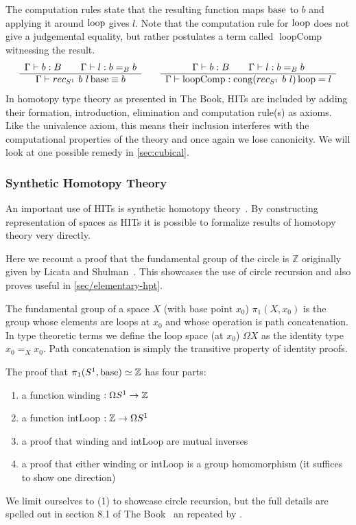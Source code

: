 The computation rules state that the resulting function maps $\operatorname{base}$ to $b$
and applying it around $\operatorname{loop}$ gives $l$.
Note that the computation rule for $\operatorname{loop}$ does not give a judgemental
equality, but rather postulates a term called $\operatorname{loopComp}$
witnessing the result.
\begin{equation*}
  \begin{array}[t]{c}
    \Gamma \vdash b : B \qquad \Gamma \vdash l : b =_B b\\
    \hline
    \Gamma \vdash rec_{S^1}~b~l \operatorname{base} \equiv b
  \end{array}
  \qquad
  \begin{array}[t]{c}
    \Gamma \vdash b : B \qquad \Gamma \vdash l : b =_B b\\
    \hline
    \Gamma \vdash \operatorname{loopComp} : \operatorname{cong} (rec_{S^1}~b~l) \operatorname{loop} = l
  \end{array}
\end{equation*}
In homotopy type theory as presented in The Book, HITs are included by adding
their formation, introduction, elimination and computation rule(s) as axioms.
Like the univalence axiom, this means their inclusion interferes with the
computational properties of the theory and once again we lose canonicity.
We will look at one possible remedy in \autoref{sec:cubical}.

\subsubsection{Synthetic Homotopy Theory}
An important use of HITs is synthetic homotopy theory~\cite{mortberg2020cubical,
  licata2015cubical}. By constructing representation of spaces as HITs it is
possible to formalize results of homotopy theory very directly.

Here we recount a proof that the fundamental group of the circle is $\mathbb{Z}$
originally given by Licata and Shulman~\cite{licata2013circle}. This showcases the use of circle
recursion and also proves useful in \autoref{sec/elementary-hpt}.

The fundamental group of a space $X$ (with base point $x_0$) $\pi_1(X, x_0)$ is
the group whose elements are loops at $x_0$ and whose operation is path
concatenation. In type theoretic terms we define the loop space (at $x_0$) $\Omega X$ as the
identity type $x_0 =_X x_0$. Path concatenation is simply the transitive
property of identity proofs.

The proof that $\pi_1(S^1, \operatorname{base}) \simeq \mathbb{Z}$ has four parts:
\begin{enumerate}
  \item a function winding $: \Omega S^1 \rightarrow \mathbb{Z}$
  \item a function intLoop $: \mathbb{Z} \rightarrow \Omega S^1$
  \item a proof that winding and intLoop are mutual inverses
  \item a proof that either winding or intLoop is a group homomorphism (it
    suffices to show one direction)
\end{enumerate}
We limit ourselves to (1) to showcase circle recursion, but the full
details are spelled out in section 8.1 of The Book~\cite{hottbook} an repeated
by \textcite{mortberg2020cubical}.

